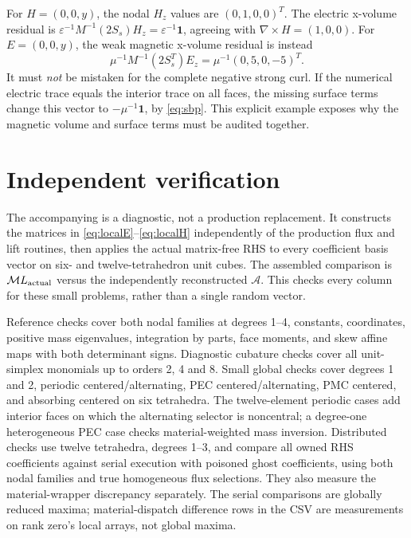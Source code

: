\documentclass[11pt,a4paper]{article}
\newcommand{\curl}{\nabla\times}
\begin{document}
For \(H=(0,0,y)\), the nodal \(H_z\) values are \((0,1,0,0)^T\).
The electric x-volume residual is
\(\varepsilon^{-1}M^{-1}(2S_s)H_z
=\varepsilon^{-1}\mathbf1\), agreeing with \(\curl H=(1,0,0)\).
For \(E=(0,0,y)\), the weak magnetic x-volume residual is instead
\begin{equation}
 \mu^{-1}M^{-1}(2S_s^T)E_z
 =\mu^{-1}(0,5,0,-5)^T.
\end{equation}
It must \emph{not} be mistaken for the complete negative strong curl.
If the numerical electric trace equals the interior trace on all faces,
the missing surface terms change this vector to
\(-\mu^{-1}\mathbf1\), by \eqref{eq:sbp}. This explicit example exposes
why the magnetic volume and surface terms must be audited together.

\section{Independent verification}\label{sec:verification}
The accompanying  is a diagnostic, not a production
replacement. It constructs the matrices in \eqref{eq:localE}--\eqref{eq:localH}
independently of the production flux and lift routines, then applies the
actual matrix-free RHS to every coefficient basis vector on six- and
twelve-tetrahedron unit cubes. The assembled comparison is \(\mathcal ML_{\rm actual}\) versus
the independently reconstructed \(\mathcal A\). This checks every column
for these small problems, rather than a single random vector.

Reference checks cover both nodal families at degrees 1--4, constants,
coordinates, positive mass eigenvalues, integration by parts, face moments,
and skew affine maps with both determinant signs. Diagnostic cubature checks
cover all unit-simplex monomials up to orders 2, 4 and 8. Small global checks
cover degrees 1 and 2, periodic centered/alternating, PEC centered/alternating,
PMC centered, and absorbing centered on six tetrahedra. The twelve-element
periodic cases add interior faces on which the alternating selector is
noncentral; a degree-one heterogeneous PEC case checks material-weighted
mass inversion. Distributed checks use twelve tetrahedra, degrees 1--3,
and compare all owned
RHS coefficients against serial execution with poisoned ghost coefficients,
using both nodal families and true homogeneous flux selections. They also
measure the material-wrapper discrepancy separately. The serial comparisons
are globally reduced maxima; material-dispatch difference rows in the CSV
are measurements on rank zero's local arrays, not global maxima.
\end{document}
